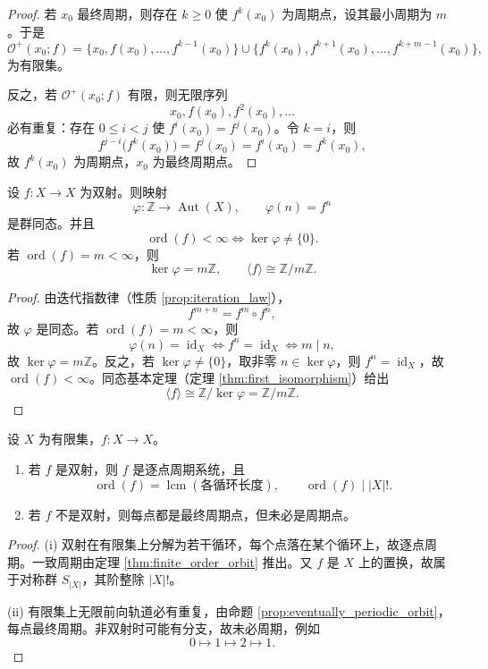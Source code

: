 \begin{proof}
若 \(x_0\) 最终周期，则存在 \(k\ge 0\) 使 \(f^k(x_0)\) 为周期点，设其最小周期为 \(m\)。于是
\[
\mathcal O^+(x_0;f)
=\{x_0,f(x_0),\dots,f^{k-1}(x_0)\}
\cup
\{f^k(x_0),f^{k+1}(x_0),\dots,f^{k+m-1}(x_0)\},
\]
为有限集。

反之，若 \(\mathcal O^+(x_0;f)\) 有限，则无限序列
\[
x_0,f(x_0),f^2(x_0),\dots
\]
必有重复：存在 \(0\le i<j\) 使 \(f^i(x_0)=f^j(x_0)\)。令 \(k=i\)，则
\[
f^{j-i}\bigl(f^k(x_0)\bigr)=f^j(x_0)=f^i(x_0)=f^k(x_0),
\]
故 \(f^k(x_0)\) 为周期点，\(x_0\) 为最终周期点。
\end{proof}

\begin{theorem}[双射演化的群同态判据]\label{thm:bijection_group_homomorphism}
设 \(f:X\to X\) 为双射。则映射
\[
\varphi:\mathbb Z\to\operatorname{Aut}(X),\qquad
\varphi(n)=f^n
\]
是群同态。并且
\[
\operatorname{ord}(f)<\infty
\iff
\ker\varphi\neq\{0\}.
\]
若 \(\operatorname{ord}(f)=m<\infty\)，则
\[
\ker\varphi=m\mathbb Z,
\qquad
\langle f\rangle\cong \mathbb Z/m\mathbb Z.
\]
\end{theorem}

\begin{proof}
由迭代指数律（性质 \ref{prop:iteration_law}），
\[
f^{m+n}=f^m\circ f^n,
\]
故 \(\varphi\) 是同态。若 \(\operatorname{ord}(f)=m<\infty\)，则
\[
\varphi(n)=\operatorname{id}_X
\iff
f^n=\operatorname{id}_X
\iff
m\mid n,
\]
故 \(\ker\varphi=m\mathbb Z\)。反之，若 \(\ker\varphi\neq\{0\}\)，取非零 \(n\in\ker\varphi\)，则 \(f^n=\operatorname{id}_X\)，故 \(\operatorname{ord}(f)<\infty\)。同态基本定理（定理 \ref{thm:first_isomorphism}）给出
\[
\langle f\rangle\cong \mathbb Z/\ker\varphi=\mathbb Z/m\mathbb Z.
\]
\end{proof}

\begin{corollary}[有限集上的周期]\label{cor:finite_set_period}
设 \(X\) 为有限集，\(f:X\to X\)。
\begin{enumerate}[label=(\roman*)]
    \item 若 \(f\) 是双射，则 \(f\) 是逐点周期系统，且
    \[
    \operatorname{ord}(f)=\operatorname{lcm}(\text{各循环长度}),
    \qquad
    \operatorname{ord}(f)\mid |X|!.
    \]
    \item 若 \(f\) 不是双射，则每点都是最终周期点，但未必是周期点。
\end{enumerate}
\end{corollary}

\begin{proof}
(i) 双射在有限集上分解为若干循环，每个点落在某个循环上，故逐点周期。一致周期由定理 \ref{thm:finite_order_orbit} 推出。又 \(f\) 是 \(X\) 上的置换，故属于对称群 \(S_{|X|}\)，其阶整除 \(|X|!\)。

(ii) 有限集上无限前向轨道必有重复，由命题 \ref{prop:eventually_periodic_orbit}，每点最终周期。非双射时可能有分支，故未必周期，例如
\[
0\mapsto 1\mapsto 2\mapsto 1.
\]
\end{proof}

